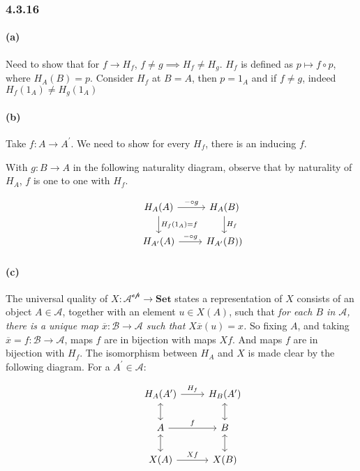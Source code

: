 \documentclass{article}
\begin{document}
\subsubsection*{4.3.16}

\paragraph{(a)}

Need to show that for $f \rightarrow H_f$, $f \neq g \implies H_f \neq H_g$. $H_f$ is defined as $p \mapsto f \circ p$, where $H_A(B) = p$. Consider $H_f$ at $B=A$, then $p=1_A$ and if $f \neq g$, indeed $H_f(1_A) \neq H_g(1_A)$

\paragraph{(b)}
Take $f: A \rightarrow A^{\prime}$. We need to show for every $H_f$, there is an inducing $f$.

With $g: B \rightarrow A$ in the following naturality diagram, observe that by naturality of $H_A$, $f$ is one to one with $H_f$.

\begin{equation*}
\begin{tikzcd}
  & H_A(A) \arrow[d,"H_f(1_A) = f"] \arrow[r, "\mathit{-} \circ g"] & H_A(B) \arrow[d,"H_f"] \\
  & H_{A^\prime}(A) \arrow[r,"\mathit{-} \circ g"] & H_{A^\prime}(B))
\end{tikzcd}
\end{equation*}

\paragraph{(c)}

The universal quality of $X\colon \mathcal{A^{\text{op}}} \rightarrow \textbf{Set}$ states a representation of $X$ consists of an object $A \in \mathcal{A}$, together with an  element $u \in X(A)$, such that
\textit{for each $B$ in $\mathcal{A}$, there is a unique map $\overline{x}\colon \mathcal{B} \rightarrow \mathcal{A}$ such that $X\overline{x}(u) = x$.}  So fixing $A$, and taking $\overline{x}=f\colon \mathcal{B} \rightarrow \mathcal{A}$, maps $f$ are in bijection with maps $Xf$. And maps $f$ are in bijection with $H_f$. The isomorphism between $H_A$ and $X$ is made clear by the following diagram. For a $A^\prime \in \mathcal{A}$:

\begin{equation*}
\begin{tikzcd}
  & H_A(A^\prime) \arrow[d, <->] \arrow[r, "H_f"] & H_{B}(A^\prime) \arrow[d, <->] \\
  & A \arrow[d, <->] \arrow[r,"f"] & B \arrow[d, <->] \\
  & X(A) \arrow[r, "Xf", {description}] & X(B)
\end{tikzcd}
\end{equation*}
\end{document}
